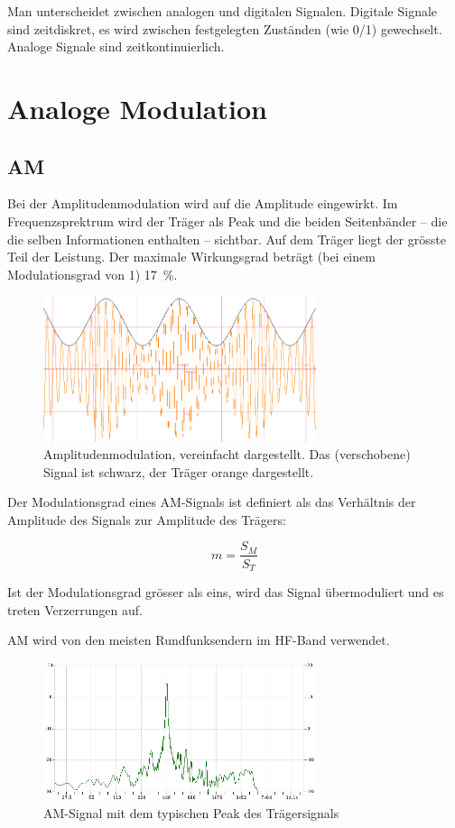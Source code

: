 Man unterscheidet zwischen analogen und digitalen Signalen. Digitale Signale sind zeitdiskret, es wird zwischen festgelegten Zuständen (wie 0/1) gewechselt. Analoge Signale sind zeitkontinuierlich. 

\section{Analoge Modulation}

\subsection{AM} \label{sec:am}
Bei der Amplitudenmodulation wird auf die Amplitude eingewirkt. Im Frequenzsprektrum wird der Träger als Peak und die beiden Seitenbänder – die die selben Informationen enthalten – sichtbar. Auf dem Träger liegt der grösste Teil der Leistung. Der maximale Wirkungsgrad beträgt (bei einem Modulationsgrad von 1) 17 \%.

\begin{figure}[h!]
 \centering
 \includegraphics[width=8cm]{./png/Graph_AM.png}
 \caption{Amplitudenmodulation, vereinfacht dargestellt. Das (verschobene) Signal ist schwarz, der Träger orange dargestellt.}
 \label{fig:am}
\end{figure}

Der Modulationsgrad eines AM-Signals ist definiert als das Verhältnis der Amplitude des Signals zur Amplitude des Trägers:

\[
 m = \frac{S_M}{S_T}
\]


Ist der Modulationsgrad grösser als eins, wird das Signal übermoduliert und es treten Verzerrungen auf. 

AM wird von den meisten Rundfunksendern im HF-Band verwendet.

\begin{figure}[h!]
 \centering
 \includegraphics[width=8cm]{./png/AM-Analysis.png}
 \caption{AM-Signal mit dem typischen Peak des Trägersignals}
 \label{fig:amAnalysis}
\end{figure}

